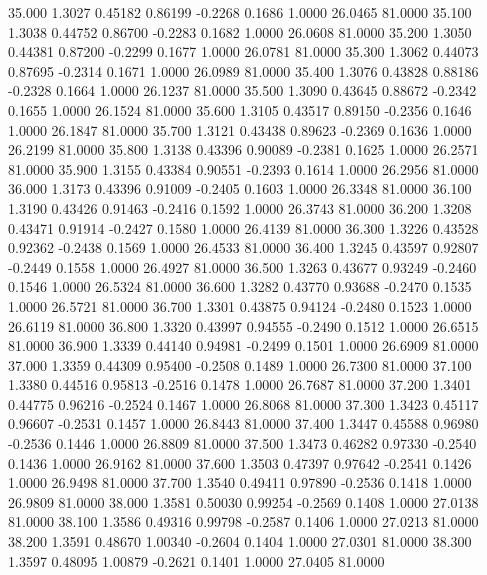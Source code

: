   35.000   1.3027   0.45182   0.86199  -0.2268   0.1686   1.0000  26.0465  81.0000
  35.100   1.3038   0.44752   0.86700  -0.2283   0.1682   1.0000  26.0608  81.0000
  35.200   1.3050   0.44381   0.87200  -0.2299   0.1677   1.0000  26.0781  81.0000
  35.300   1.3062   0.44073   0.87695  -0.2314   0.1671   1.0000  26.0989  81.0000
  35.400   1.3076   0.43828   0.88186  -0.2328   0.1664   1.0000  26.1237  81.0000
  35.500   1.3090   0.43645   0.88672  -0.2342   0.1655   1.0000  26.1524  81.0000
  35.600   1.3105   0.43517   0.89150  -0.2356   0.1646   1.0000  26.1847  81.0000
  35.700   1.3121   0.43438   0.89623  -0.2369   0.1636   1.0000  26.2199  81.0000
  35.800   1.3138   0.43396   0.90089  -0.2381   0.1625   1.0000  26.2571  81.0000
  35.900   1.3155   0.43384   0.90551  -0.2393   0.1614   1.0000  26.2956  81.0000
  36.000   1.3173   0.43396   0.91009  -0.2405   0.1603   1.0000  26.3348  81.0000
  36.100   1.3190   0.43426   0.91463  -0.2416   0.1592   1.0000  26.3743  81.0000
  36.200   1.3208   0.43471   0.91914  -0.2427   0.1580   1.0000  26.4139  81.0000
  36.300   1.3226   0.43528   0.92362  -0.2438   0.1569   1.0000  26.4533  81.0000
  36.400   1.3245   0.43597   0.92807  -0.2449   0.1558   1.0000  26.4927  81.0000
  36.500   1.3263   0.43677   0.93249  -0.2460   0.1546   1.0000  26.5324  81.0000
  36.600   1.3282   0.43770   0.93688  -0.2470   0.1535   1.0000  26.5721  81.0000
  36.700   1.3301   0.43875   0.94124  -0.2480   0.1523   1.0000  26.6119  81.0000
  36.800   1.3320   0.43997   0.94555  -0.2490   0.1512   1.0000  26.6515  81.0000
  36.900   1.3339   0.44140   0.94981  -0.2499   0.1501   1.0000  26.6909  81.0000
  37.000   1.3359   0.44309   0.95400  -0.2508   0.1489   1.0000  26.7300  81.0000
  37.100   1.3380   0.44516   0.95813  -0.2516   0.1478   1.0000  26.7687  81.0000
  37.200   1.3401   0.44775   0.96216  -0.2524   0.1467   1.0000  26.8068  81.0000
  37.300   1.3423   0.45117   0.96607  -0.2531   0.1457   1.0000  26.8443  81.0000
  37.400   1.3447   0.45588   0.96980  -0.2536   0.1446   1.0000  26.8809  81.0000
  37.500   1.3473   0.46282   0.97330  -0.2540   0.1436   1.0000  26.9162  81.0000
  37.600   1.3503   0.47397   0.97642  -0.2541   0.1426   1.0000  26.9498  81.0000
  37.700   1.3540   0.49411   0.97890  -0.2536   0.1418   1.0000  26.9809  81.0000
  38.000   1.3581   0.50030   0.99254  -0.2569   0.1408   1.0000  27.0138  81.0000
  38.100   1.3586   0.49316   0.99798  -0.2587   0.1406   1.0000  27.0213  81.0000
  38.200   1.3591   0.48670   1.00340  -0.2604   0.1404   1.0000  27.0301  81.0000
  38.300   1.3597   0.48095   1.00879  -0.2621   0.1401   1.0000  27.0405  81.0000
